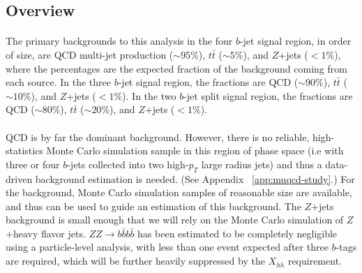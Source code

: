 
\subsection{Overview}

\paragraph{}
The primary backgrounds to this analysis in the four $b$-jet signal region, in order of size, are QCD multi-jet production ($\sim 95\%$), $t\bar{t}$ ($\sim 5\%$), and $Z$+jets ($< 1\%$), where the percentages are the expected fraction of the background coming from each source. In the three $b$-jet signal region, the fractions are QCD ($\sim 90\%$), $t\bar{t}$ ($\sim 10\%$), and $Z$+jets ($< 1\%$).  In the two $b$-jet split signal region, the fractions are QCD ($\sim 80\%$), $t\bar{t}$ ($\sim 20\%$), and $Z$+jets ($< 1\%$).

\paragraph{}
QCD is by far the dominant background. However, there is no reliable, high-statistics Monte Carlo simulation sample in this region of phase space (i.e with three or four $b$-jets collected into two high-$p_{T}$ large radius jets) and thus a data-driven background estimation is needed. (See Appendix ~\ref{app:muqcd-study}.) For the \ttbar background, Monte Carlo simulation samples of reasonable size are available, and thus can be used to guide an estimation of this background. The $Z$+jets background is small enough that we will rely on the Monte Carlo simulation of $Z$+heavy flavor jets. $ZZ\to b\bar{b}b\bar{b}$ has been estimated to be completely negligible using a particle-level analysis, with less than one event expected after three $b$-tags are required, which will be further heavily suppressed by the $X_{hh}$ requirement.

